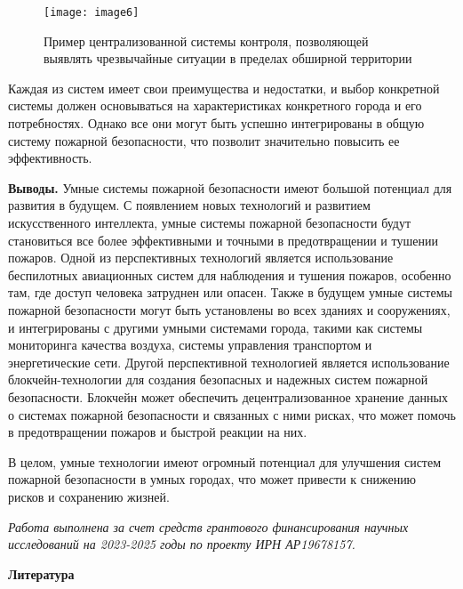 \begin{figure}[H]
  \centering
  \texttt{[image: image6]}
  \caption{Пример централизованной системы контроля, позволяющей выявлять
чрезвычайные ситуации в пределах обширной территории}
\end{figure}

\begin{multicols}{2}

Каждая из систем имеет свои преимущества и недостатки, и выбор
конкретной системы должен основываться на характеристиках конкретного
города и его потребностях. Однако все они могут быть успешно
интегрированы в общую систему пожарной безопасности, что позволит
значительно повысить ее эффективность.

{\bfseries Выводы.} Умные системы пожарной безопасности имеют большой
потенциал для развития в будущем. С появлением новых технологий и
развитием искусственного интеллекта, умные системы пожарной безопасности
будут становиться все более эффективными и точными в предотвращении и
тушении пожаров. Одной из перспективных технологий является
использование беспилотных авиационных систем для наблюдения и тушения
пожаров, особенно там, где доступ человека затруднен или опасен. Также в
будущем умные системы пожарной безопасности могут быть установлены во
всех зданиях и сооружениях, и интегрированы с другими умными системами
города, такими как системы мониторинга качества воздуха, системы
управления транспортом и энергетические сети. Другой перспективной
технологией является использование блокчейн-технологии для создания
безопасных и надежных систем пожарной безопасности. Блокчейн может
обеспечить децентрализованное хранение данных о системах пожарной
безопасности и связанных с ними рисках, что может помочь в
предотвращении пожаров и быстрой реакции на них.

В целом, умные технологии имеют огромный потенциал для улучшения систем
пожарной безопасности в умных городах, что может привести к снижению
рисков и сохранению жизней.
\end{multicols}

\emph{Работа выполнена за счет средств грантового финансирования научных
исследований на 2023-2025 годы по проекту ИРН АР19678157.}

\begin{center}
{\bfseries Литература}
\end{center}

